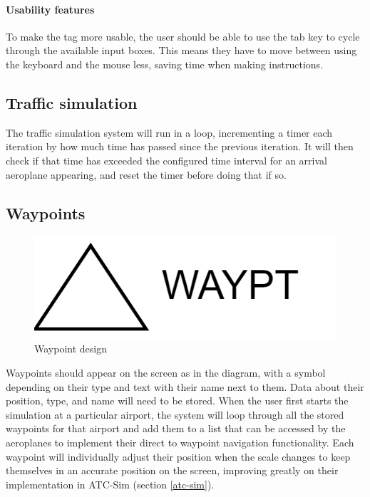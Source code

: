 \documentclass{article}
\begin{document}
\paragraph{Usability features}
To make the tag more usable, the user should be able to use the tab key to cycle through the available input boxes. This means they have to move between using the keyboard and the mouse less, saving time when making instructions.

\subsection{Traffic simulation}
The traffic simulation system will run in a loop, incrementing a timer each iteration by how much time has passed since the previous iteration.
It will then check if that time has exceeded the configured time interval for an arrival aeroplane appearing, and reset the timer before doing that if so.

\subsection{Waypoints}
\begin{figure}[H]
\centering
\includegraphics{diagrams/waypointdesign.png}
\caption{\label{fig:waypointdesign}Waypoint design}
\end{figure}

Waypoints should appear on the screen as in the diagram, with a symbol depending on their type and text with their name next to them.
Data about their position, type, and name will need to be stored.
When the user first starts the simulation at a particular airport, the system will loop through all the stored waypoints for that airport and add them to a list that can be accessed by the aeroplanes to implement their direct to waypoint navigation functionality.
Each waypoint will individually adjust their position when the scale changes to keep themselves in an accurate position on the screen, improving greatly on their implementation in ATC-Sim (section \ref{atc-sim}).
\end{document}
